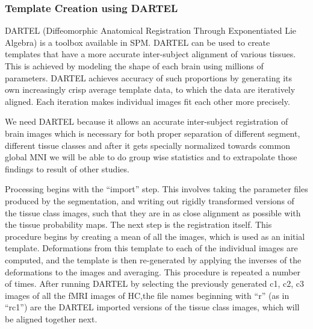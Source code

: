 \documentclass[12pt]{article}
\begin{document}
\subsubsection{Template Creation using DARTEL}

DARTEL (Diffeomorphic Anatomical Registration Through Exponentiated
Lie Algebra) is a toolbox available in SPM. DARTEL can be used to
create templates that have a more accurate inter-subject alignment of
various tissues. This is achieved by modeling the shape of each brain
using millions of parameters. DARTEL achieves accuracy of such
proportions by generating its own increasingly crisp average template
data, to which the data are iteratively aligned. Each iteration makes
individual images fit each other more precisely.

We need DARTEL because it allows an accurate inter-subject
registration of brain images which is necessary for both proper
separation of different segment, different tissue classes and after
it gets specially normalized towards common global MNI we will be able
to do group wise statistics and to extrapolate those findings to
result of other studies.

Processing begins with the ``import'' step.  This involves taking the
parameter files produced by the segmentation, and writing out rigidly
transformed versions of the tissue class images, such that they are in
as close alignment as possible with the tissue probability maps. The
next step is the registration itself.  This procedure begins by
creating a mean of all the images, which is used as an initial
template. Deformations from this template to each of the individual
images are computed, and the template is then re-generated by applying
the inverses of the deformations to the images and averaging. This
procedure is repeated a number of times.  After running DARTEL by
selecting the previously generated c1, c2, c3 images of all the fMRI
images of HC,the file names beginning with ``r'' (as in ``rc1'') are
the DARTEL imported versions of the tissue class images, which will be
aligned together next.
\end{document}
